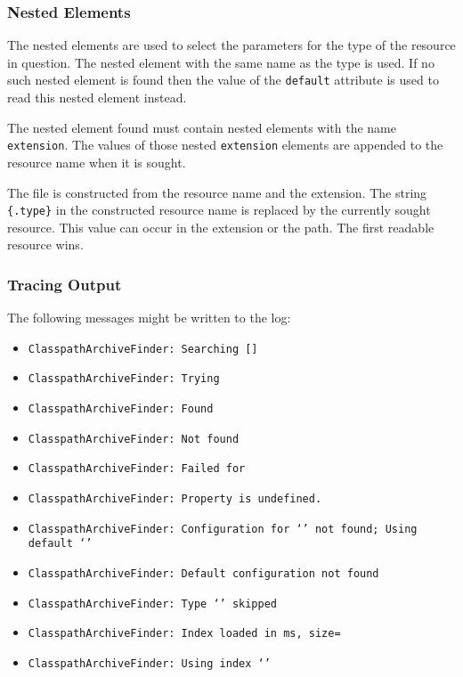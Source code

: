 \subsubsection*{Nested Elements}

The nested elements are used to select the parameters for the type of
the resource in question. The nested element with the same name as the
type is used. If no such nested element is found then the value of the
\texttt{default} attribute is used to read this nested element
instead. 

The nested element found must contain nested elements with the name
\texttt{extension}. The values of those nested \texttt{extension}
elements are appended to the resource name when it is sought.

The file is constructed from the resource name and the
extension. The string \verb|{.type}| in the constructed resource name
is replaced by the currently sought resource. This value can occur in
the extension or the path. The first readable resource wins.


\subsubsection*{Tracing Output}

The following messages might be written to the log:

{\small
\begin{itemize}
\item{\tt ClasspathArchiveFinder: Searching  []}
\item{\tt ClasspathArchiveFinder: Trying }
\item{\tt ClasspathArchiveFinder: Found }
\item{\tt ClasspathArchiveFinder: Not found }
\item{\tt ClasspathArchiveFinder: Failed for }
\item{\tt ClasspathArchiveFinder: Property  is undefined.}
\item{\tt ClasspathArchiveFinder: Configuration for `'
    not found;  Using default `'}
\item{\tt ClasspathArchiveFinder: Default configuration not found}
\item{\tt ClasspathArchiveFinder: Type `' skipped}
\item{\tt ClasspathArchiveFinder: Index loaded in  ms, size=}
\item{\tt ClasspathArchiveFinder: Using index `'}
\end{itemize}}

